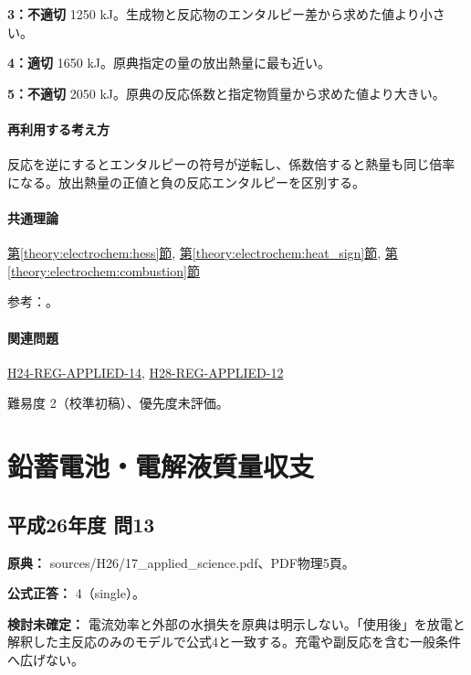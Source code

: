 \noindent\textbf{3：不適切} 1250 kJ。生成物と反応物のエンタルピー差から求めた値より小さい。\par

\noindent\textbf{4：適切} 1650 kJ。原典指定の量の放出熱量に最も近い。\par

\noindent\textbf{5：不適切} 2050 kJ。原典の反応係数と指定物質量から求めた値より大きい。\par

\paragraph{再利用する考え方} 反応を逆にするとエンタルピーの符号が逆転し、係数倍すると熱量も同じ倍率になる。放出熱量の正値と負の反応エンタルピーを区別する。

\paragraph{共通理論} \hyperref[theory:electrochem:hess]{第\ref*{theory:electrochem:hess}節}, \hyperref[theory:electrochem:heat_sign]{第\ref*{theory:electrochem:heat_sign}節}, \hyperref[theory:electrochem:combustion]{第\ref*{theory:electrochem:combustion}節}

\par 参考：\cite{openstax_hess}。

\paragraph{関連問題} \hyperref[q:h24-reg-applied-14]{H24-REG-APPLIED-14}, \hyperref[q:h28-reg-applied-12]{H28-REG-APPLIED-12}

\par 難易度 2（校準初稿）、優先度未評価。

\section{鉛蓄電池・電解液質量収支}

\subsection{平成26年度 問13}
\label{q:h26-reg-applied-13}

\noindent\textbf{原典：} sources/H26/17\_applied\_science.pdf、PDF物理5頁。

\textbf{公式正答：} 4（single）。

\par\textbf{検討未確定：} 電流効率と外部の水損失を原典は明示しない。「使用後」を放電と解釈した主反応のみのモデルで公式4と一致する。充電や副反応を含む一般条件へ広げない。

